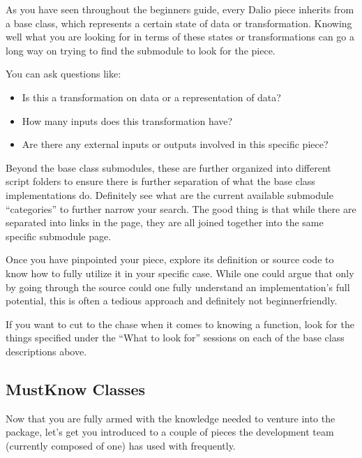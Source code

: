 \documentclass[letterpaper,10pt,english]{sphinxmanual}
\begin{document}

As you have seen throughout the beginners guide, every Dal\sphinxhyphen{}io piece inherits from a base class, which represents a certain state of data or transformation. Knowing well what you are looking for in terms of these states or transformations can go a long way on trying to find the submodule to look for the piece.

You can ask questions like:
\begin{itemize}
\item {} 
Is this a transformation on data or a representation of data?

\item {} 
How many inputs does this transformation have?

\item {} 
Are there any external inputs or outputs involved in this specific piece?

\end{itemize}

Beyond the base class submodules, these are further organized into different script folders to ensure there is further separation of what the base class implementations do. Definitely see what are the current available submodule “categories” to further narrow your search. The good thing is that while there are separated into links in the  page, they are all joined together into the same specific submodule page.


Once you have pinpointed your piece, explore its definition or source code to know how to fully utilize it in your specific case. While one could argue that only by going through the source could one fully understand an implementation’s full potential, this is often a tedious approach and definitely not beginner\sphinxhyphen{}friendly.

If you want to cut to the chase when it comes to knowing a function, look for the things specified under the “What to look for” sessions on each of the base class descriptions above.


\subsection{Must\sphinxhyphen{}Know Classes}
\label{\detokenize{beginners-guide:must-know-classes}}
Now that you are fully armed with the knowledge needed to venture into the package, let’s get you introduced to a couple of pieces the development team (currently composed of one) has used with frequently.
\end{document}
